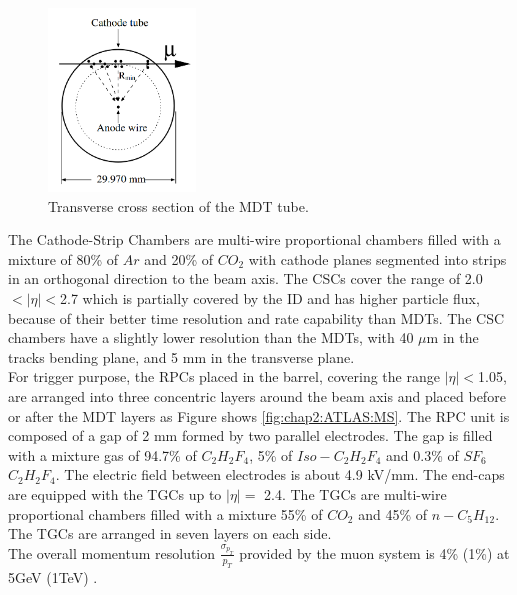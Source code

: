 \begin{figure}[htbp]
    \centering
    \includegraphics[width=0.35\textwidth]{Ch2/Img/Tube.png}
    \caption{Transverse cross section of the MDT tube.}
    \label{fig:chap2:ATLAS:MS:Tube}
\end{figure}
The Cathode-Strip Chambers are multi-wire proportional chambers filled with a mixture of 80\% of $Ar$ and 20\% of $CO_2$ with cathode planes segmented into strips in an orthogonal direction to the beam axis. The CSCs cover the range of 2.0$<|\eta|<$2.7 which is partially covered by the ID and has higher particle flux, because of their better time resolution and rate capability than MDTs. The CSC chambers have a slightly lower resolution than the MDTs, with 40 $\mu$m in the tracks bending plane, and 5 mm in the transverse plane. \\
For trigger purpose, the RPCs placed in the barrel, covering the range $|\eta|<$1.05,  are arranged into three concentric layers around the beam axis and placed before or after the MDT layers as Figure shows \ref{fig:chap2:ATLAS:MS}. The RPC unit is composed of a gap of 2 mm formed by two parallel electrodes. The gap is filled with a mixture gas of 94.7\% of $C_2H_2F_4$, 5\% of $Iso-C_2H_2F_4$ and 0.3\% of $SF_6$ $C_2H_2F_4$. The electric field between electrodes is about 4.9 kV/mm. The end-caps are equipped with the TGCs up to $|\eta|=$ 2.4. The TGCs are multi-wire proportional chambers filled with a mixture 55\% of $CO_2$ and 45\% of $n-C_5H_{12}$. The TGCs are arranged in seven layers on each side.\\
The overall momentum resolution $\frac{\sigma_{p_T}}{p_T}$ provided by the muon system is 4\% (1\%) at 5GeV (1TeV) \cite{ATLAS_Perf}.

